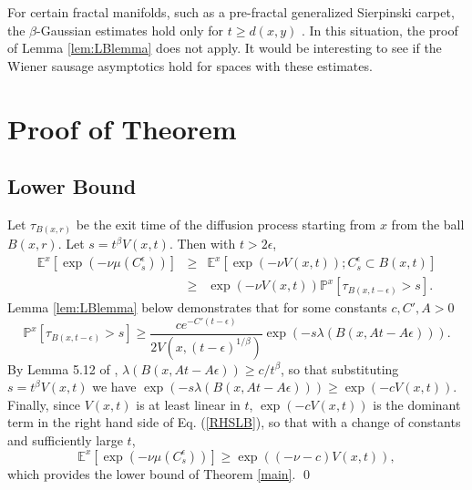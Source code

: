 \documentclass[letterpaper,oneside,english]{amsart}
\begin{document}
For certain fractal manifolds, such as a pre-fractal generalized Sierpinski carpet, the $\beta$-Gaussian estimates hold only for $t\ge d(x,y)$ \cite{BarlowBassBrownian}.  In this situation, the proof of  Lemma \ref{lem:LBlemma} does not apply.  It would be interesting to see if the Wiener sausage asymptotics hold for spaces with these estimates.

\section{Proof of Theorem}\label{Proof}
\subsection{Lower Bound}\label{Lower}
Let $\tau_{B(x,r)}$ be the exit time of the diffusion process starting from $x$ from the ball $B(x,r)$.   Let $s=t^{\beta}V(x,t)$.  Then with $t>2\epsilon$,
\begin{eqnarray}
\mathbb{E}^x[\exp(-\nu  \mu(C_s^{\epsilon}))] & \ge & \mathbb{E}^x[\exp(-\nu V(x,t)); C_s^{\epsilon}\subset B(x,t)] \nonumber \\
 & \ge & \exp(-\nu V(x,t)) \mathbb{P}^x[\tau_{B(x,t-\epsilon)}>s]. \label{RHSLB}
\end{eqnarray}
Lemma \ref{lem:LBlemma} below demonstrates that for some constants $c, C', A>0$ 
\begin{equation*}
\mathbb{P}^x[\tau_{B(x,t-\epsilon)}>s]\ge \frac{c e^{-C'(t-\epsilon)}}{2V(x,(t-\epsilon)^{1/\beta})}\exp(-s\lambda(B(x,At-A\epsilon))). 
\end{equation*}
By Lemma 5.12 of \cite{LSCHebisch}, $\lambda(B(x,At-A\epsilon))\ge c/t^{\beta}$, so that substituting $s=t^{\beta}V(x,t)$ we have 
$ \exp(-s\lambda(B(x,At-A\epsilon))) \ge \exp(-cV(x,t))$.
Finally, since $V(x,t)$ is at least linear in $t$, $\exp(-cV(x,t))$ is the dominant term in the right hand side of Eq. (\ref{RHSLB}), so that with a change of constants and sufficiently large $t$, 
\begin{equation*}
\mathbb{E}^x[\exp(-\nu  \mu(C_s^{\epsilon}))]  \ge  \exp((-\nu-c) V(x,t)),
\end{equation*}  which provides the lower bound of Theorem \ref{main}.  \qed 
\end{document}
